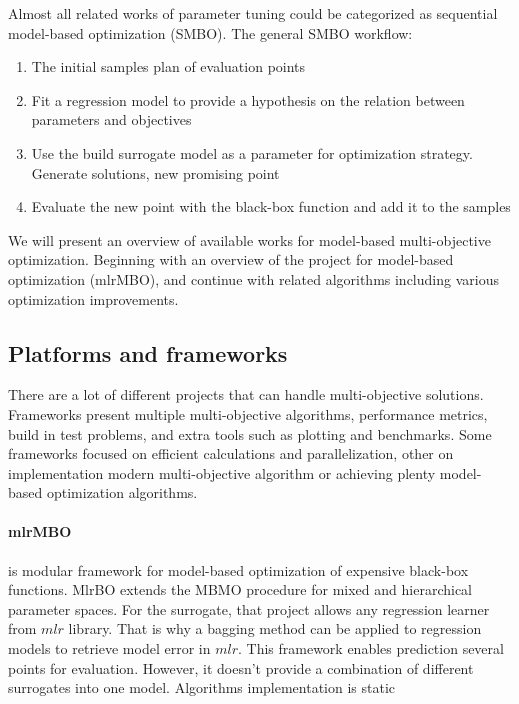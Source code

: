         Almost all related works of parameter tuning could be categorized as sequential model-based optimization (SMBO)\cite{JonesSW98}.
        The general SMBO workflow:
        \begin{enumerate}
            \item The initial samples plan of evaluation points
            \item Fit a regression model to provide a hypothesis on the relation between parameters and objectives
            \item Use the build surrogate model as a parameter for optimization strategy. Generate solutions, new promising point
            \item Evaluate the new point with the black-box function and add it to the samples
        \end{enumerate}
        We will present an overview of available works for model-based multi-objective optimization. Beginning with an overview of the project for model-based optimization (mlrMBO), and continue with related algorithms including various optimization improvements.



    \subsection{Platforms and frameworks}
        There are a lot of different projects that can handle multi-objective solutions. Frameworks present multiple multi-objective algorithms, performance metrics, build in test problems, and extra tools such as plotting and benchmarks. Some frameworks focused on efficient calculations and parallelization\cite{francesco_biscani_2019}, other on implementation modern multi-objective algorithm\cite{benitezhidalgo2019jmetalpy, TianPlatEMO} or achieving plenty model-based optimization algorithms\cite{BischlmlrMBO}. 

        \paragraph{mlrMBO}\cite{BischlmlrMBO} is modular framework for model-based optimization of expensive black-box functions. MlrBO extends the MBMO procedure for mixed and hierarchical parameter spaces. For the surrogate, that project allows any regression learner from $mlr$ library. That is why a bagging method can be applied to regression models to retrieve model error in $mlr$. This framework enables prediction several points for evaluation. However, it doesn't provide a combination of different surrogates into one model. Algorithms implementation is static
       
